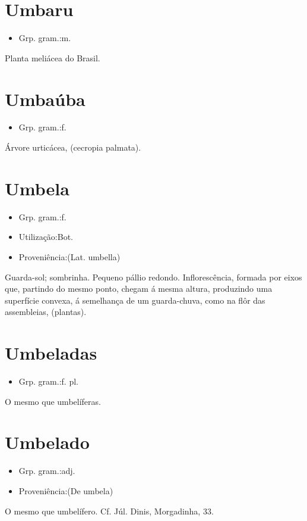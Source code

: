 \documentclass{article}
\begin{document}
\section{Umbaru}
\begin{itemize}
\item {Grp. gram.:m.}
\end{itemize}
Planta meliácea do Brasil.
\section{Umbaúba}
\begin{itemize}
\item {Grp. gram.:f.}
\end{itemize}
Árvore urticácea, (\textunderscore cecropia palmata\textunderscore ).
\section{Umbela}
\begin{itemize}
\item {Grp. gram.:f.}
\end{itemize}
\begin{itemize}
\item {Utilização:Bot.}
\end{itemize}
\begin{itemize}
\item {Proveniência:(Lat. \textunderscore umbella\textunderscore )}
\end{itemize}
Guarda-sol; sombrinha.
Pequeno pállio redondo.
Inflorescência, formada por eixos que, partindo do mesmo ponto, chegam á mesma altura, produzindo uma superfície convexa, á semelhança de um guarda-chuva, como na flôr das assembleias, (plantas).
\section{Umbeladas}
\begin{itemize}
\item {Grp. gram.:f. pl.}
\end{itemize}
O mesmo que \textunderscore umbelíferas\textunderscore .
\section{Umbelado}
\begin{itemize}
\item {Grp. gram.:adj.}
\end{itemize}
\begin{itemize}
\item {Proveniência:(De \textunderscore umbela\textunderscore )}
\end{itemize}
O mesmo que \textunderscore umbelífero\textunderscore . Cf. Júl. Dinis, \textunderscore Morgadinha\textunderscore , 33.
\end{document}
